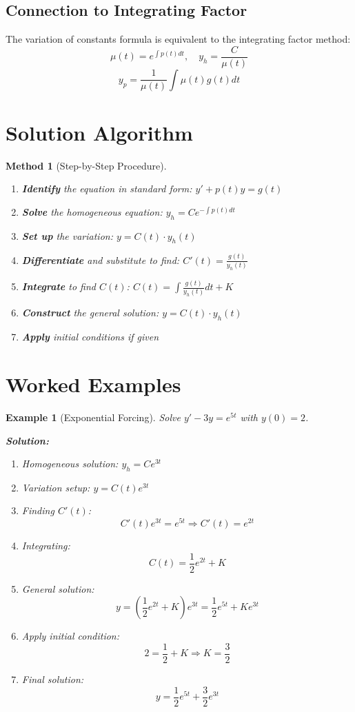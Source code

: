 \documentclass[12pt]{article}
\newtheorem{method}{Method}
\newtheorem{example}{Example}
\begin{document}
\subsection{Connection to Integrating Factor}

\begin{insight}
The variation of constants formula is equivalent to the integrating factor method:
\[\mu(t) = e^{\int p(t)dt}, \quad y_h = \frac{C}{\mu(t)}\]
\[y_p = \frac{1}{\mu(t)} \int \mu(t)g(t)dt\]
\end{insight}

\section{Solution Algorithm}

\begin{method}[Step-by-Step Procedure]
\begin{enumerate}
    \item \textbf{Identify} the equation in standard form: $y' + p(t)y = g(t)$
    \item \textbf{Solve} the homogeneous equation: $y_h = Ce^{-\int p(t)dt}$
    \item \textbf{Set up} the variation: $y = C(t) \cdot y_h(t)$
    \item \textbf{Differentiate} and substitute to find: $C'(t) = \frac{g(t)}{y_h(t)}$
    \item \textbf{Integrate} to find $C(t)$: $C(t) = \int \frac{g(t)}{y_h(t)}dt + K$
    \item \textbf{Construct} the general solution: $y = C(t) \cdot y_h(t)$
    \item \textbf{Apply} initial conditions if given
\end{enumerate}
\end{method}

\section{Worked Examples}

\begin{example}[Exponential Forcing]
Solve $y' - 3y = e^{5t}$ with $y(0) = 2$.

\textbf{Solution:}
\begin{enumerate}
    \item Homogeneous solution: $y_h = Ce^{3t}$
    \item Variation setup: $y = C(t)e^{3t}$
    \item Finding $C'(t)$:
    \[C'(t)e^{3t} = e^{5t} \Rightarrow C'(t) = e^{2t}\]
    \item Integrating:
    \[C(t) = \frac{1}{2}e^{2t} + K\]
    \item General solution:
    \[y = \left(\frac{1}{2}e^{2t} + K\right)e^{3t} = \frac{1}{2}e^{5t} + Ke^{3t}\]
    \item Apply initial condition:
    \[2 = \frac{1}{2} + K \Rightarrow K = \frac{3}{2}\]
    \item Final solution:
    \[y = \frac{1}{2}e^{5t} + \frac{3}{2}e^{3t}\]
\end{enumerate}
\end{example}
\end{document}
